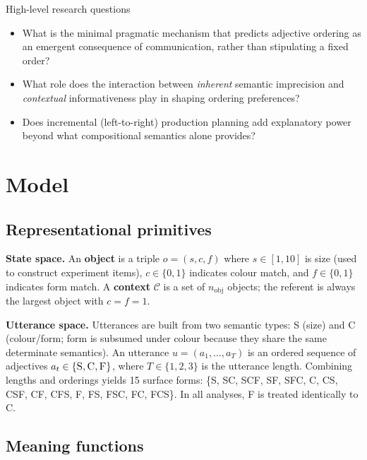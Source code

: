 \documentclass[11pt, a4paper]{article}
\newcommand{\adj}[1]{\textsc{#1}}   %
\begin{document}
\begin{discussbox}{High-level research questions}
\begin{itemize}[leftmargin=*]
  \item What is the minimal pragmatic mechanism that predicts adjective ordering as an emergent consequence of communication, rather than stipulating a fixed order?
  \item What role does the interaction between \emph{inherent} semantic imprecision and \emph{contextual} informativeness play in shaping ordering preferences?
  \item Does incremental (left-to-right) production planning add explanatory power beyond what compositional semantics alone provides?
\end{itemize}
\end{discussbox}
\newpage


\section{Model}
\label{sec:model}

\subsection{Representational primitives}
\label{sec:model:primitives}

\textbf{State space.} An \textbf{object} is a triple $o = (s, c, f)$ where $s \in [1,10]$ is size (used to construct experiment items), $c \in \{0,1\}$ indicates colour match, and $f \in \{0,1\}$ indicates form match.
A \textbf{context} $\mathcal{C}$ is a set of $n_\text{obj}$ objects; the referent is always the largest object with $c=f=1$.

\textbf{Utterance space.} Utterances are built from two semantic types: \adj{S} (size) and \adj{C} (colour/form; form is subsumed under colour because they share the same determinate semantics).
An utterance $u = (a_1, \ldots, a_T)$ is an ordered sequence of adjectives $a_t \in \{\adj{S}, \adj{C}, \adj{F}\}$, where $T \in \{1,2,3\}$ is the utterance length.
Combining lengths and orderings yields 15 surface forms:
\{S, SC, SCF, SF, SFC, C, CS, CSF, CF, CFS, F, FS, FSC, FC, FCS\}.
In all analyses, \adj{F} is treated identically to \adj{C}.

\subsection{Meaning functions}
\label{sec:model:semantics}
\end{document}
